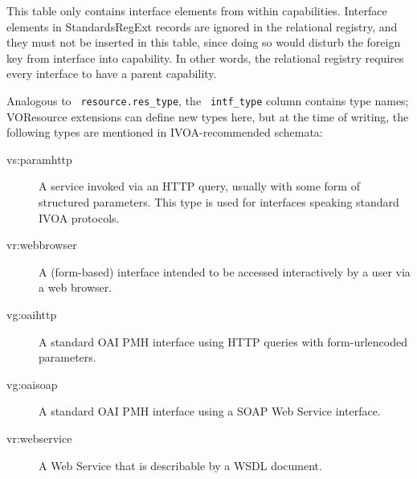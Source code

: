 \documentclass[11pt,a4paper]{ivoa}
\newcommand{\rtent}[1]{\texttt{\color{rtcolor} #1}}
\begin{document}
This table only contains interface elements from within capabilities.
Interface elements in StandardsRegExt records are ignored in the
relational registry,
and they must not be inserted in this table, since doing so would disturb
the foreign key from interface into capability.  In other words,
the relational registry requires every interface to have a parent capability.

Analogous to \rtent{resource.res\_type}, the
\rtent{intf\_type} column contains type names; VOResource extensions
can define new types here, but at the time of writing, the following
types are mentioned in IVOA-recommended schemata:


\begin{description}
\item[vs:paramhttp]A service invoked via an HTTP query, usually with some form of
structured parameters. This type is used for interfaces speaking
standard IVOA protocols.
\item[vr:webbrowser]A (form-based) interface intended to be accessed interactively by a
user via a web browser.
\item[vg:oaihttp]A standard OAI PMH interface using HTTP queries with form-urlencoded
parameters.
\item[vg:oaisoap]A standard OAI PMH interface using a SOAP Web Service
interface.
\item[vr:webservice]A Web Service that is describable by a WSDL document.

\end{description}


\end{document}
